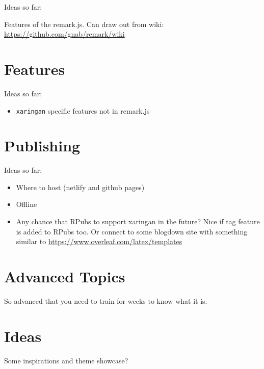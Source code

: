 \documentclass[
]{book}
\providecommand{\tightlist}{%
  \setlength{\itemsep}{0pt}\setlength{\parskip}{0pt}}
\begin{document}
Ideas so far:

Features of the remark.js. Can draw out from wiki: \url{https://github.com/gnab/remark/wiki}

\hypertarget{feature}{%
\chapter{Features}\label{feature}}

Ideas so far:

\begin{itemize}
\tightlist
\item
  \texttt{xaringan} specific features not in remark.js
\end{itemize}

\hypertarget{publishing}{%
\chapter{Publishing}\label{publishing}}

Ideas so far:

\begin{itemize}
\tightlist
\item
  Where to host (netlify and github pages)
\item
  Offline
\item
  Any chance that RPubs to support xaringan in the future? Nice if tag feature is added to RPubs too. Or connect to some blogdown site with something similar to \url{https://www.overleaf.com/latex/templates}
\end{itemize}

\hypertarget{advanced}{%
\chapter{Advanced Topics}\label{advanced}}

So advanced that you need to train for weeks to know what it is.

\hypertarget{ideas}{%
\chapter{Ideas}\label{ideas}}

Some inspirations and theme showcase?

  

\backmatter
\printindex
\end{document}
